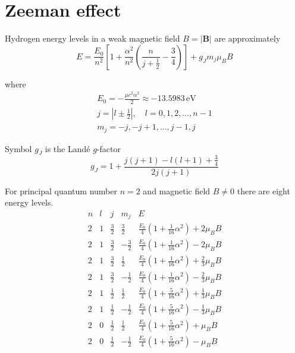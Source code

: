 

\section*{Zeeman effect}

Hydrogen energy levels in a weak magnetic field $B=|\mathbf B|$ are approximately
\begin{equation*}
E=\frac{E_0}{n^2}
\left[
1+\frac{\alpha^2}{n^2}\left(\frac{n}{j+\frac{1}{2}}-\frac{3}{4}\right)
\right]+g_Jm_j\mu_BB
\end{equation*}

where
\begin{gather*}
E_0=-\frac{\mu c^2\alpha^2}{2}\approx-13.5983\,\text{eV}
\\[1ex]
j=\left|l\pm\tfrac{1}{2}\right|,\quad l=0,1,2,\ldots,n-1
\\[1ex]
m_j=-j,-j+1,\ldots,j-1,j
\end{gather*}

Symbol $g_J$ is the Land\'e $g$-factor
\begin{equation*}
g_J=1+\frac{j(j+1)-l(l+1)+\frac{3}{4}}{2j(j+1)}
\end{equation*}

For principal quantum number $n=2$ and magnetic field $B\ne0$ there are eight energy levels.
\begin{equation*}
\begin{matrix}
n & l & j & m_j & E
\\[2ex]
2 & 1 & \frac{3}{2} & \frac{3}{2} &
\frac{E_0}{4}\left(1+\tfrac{1}{16}\alpha^2\right)+2\mu_BB
\\[2ex]
2 & 1 & \frac{3}{2} & -\frac{3}{2} &
\frac{E_0}{4}\left(1+\tfrac{1}{16}\alpha^2\right)-2\mu_BB
\\[2ex]
2 & 1 & \frac{3}{2} & \frac{1}{2} &
\frac{E_0}{4}\left(1+\tfrac{1}{16}\alpha^2\right)+\frac{2}{3}\mu_BB
\\[2ex]
2 & 1 & \frac{3}{2} & -\frac{1}{2} &
\frac{E_0}{4}\left(1+\tfrac{1}{16}\alpha^2\right)-\frac{2}{3}\mu_BB
\\[2ex]
2 & 1 & \frac{1}{2} & \frac{1}{2} &
\frac{E_0}{4}\left(1+\tfrac{5}{16}\alpha^2\right)+\frac{1}{3}\mu_BB
\\[2ex]
2 & 1 & \frac{1}{2} & -\frac{1}{2} &
\frac{E_0}{4}\left(1+\tfrac{5}{16}\alpha^2\right)-\frac{1}{3}\mu_BB
\\[2ex]
2 & 0 & \frac{1}{2} & \frac{1}{2} &
\frac{E_0}{4}\left(1+\tfrac{5}{16}\alpha^2\right)+\mu_BB
\\[2ex]
2 & 0 & \frac{1}{2} & -\frac{1}{2} &
\frac{E_0}{4}\left(1+\tfrac{5}{16}\alpha^2\right)-\mu_BB
\end{matrix}
\end{equation*}


